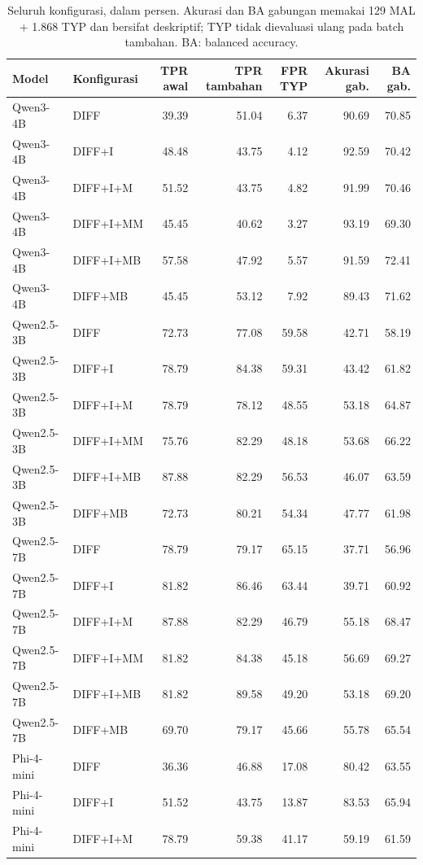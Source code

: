 \begin{table}[t]
\centering\small
\caption{Seluruh konfigurasi, dalam persen. Akurasi dan BA gabungan memakai 129 MAL + 1.868 TYP dan bersifat deskriptif; TYP tidak dievaluasi ulang pada batch tambahan. BA: balanced accuracy.}
\label{tab:full}
\begin{tabular}{llrrrrr}
\toprule
Model & Konfigurasi & TPR awal & TPR tambahan & FPR TYP & Akurasi gab. & BA gab. \\
\midrule
Qwen3-4B & DIFF & 39.39 & 51.04 & 6.37 & 90.69 & 70.85 \\
Qwen3-4B & DIFF+I & 48.48 & 43.75 & 4.12 & 92.59 & 70.42 \\
Qwen3-4B & DIFF+I+M & 51.52 & 43.75 & 4.82 & 91.99 & 70.46 \\
Qwen3-4B & DIFF+I+MM & 45.45 & 40.62 & 3.27 & 93.19 & 69.30 \\
Qwen3-4B & DIFF+I+MB & 57.58 & 47.92 & 5.57 & 91.59 & 72.41 \\
Qwen3-4B & DIFF+MB & 45.45 & 53.12 & 7.92 & 89.43 & 71.62 \\
Qwen2.5-3B & DIFF & 72.73 & 77.08 & 59.58 & 42.71 & 58.19 \\
Qwen2.5-3B & DIFF+I & 78.79 & 84.38 & 59.31 & 43.42 & 61.82 \\
Qwen2.5-3B & DIFF+I+M & 78.79 & 78.12 & 48.55 & 53.18 & 64.87 \\
Qwen2.5-3B & DIFF+I+MM & 75.76 & 82.29 & 48.18 & 53.68 & 66.22 \\
Qwen2.5-3B & DIFF+I+MB & 87.88 & 82.29 & 56.53 & 46.07 & 63.59 \\
Qwen2.5-3B & DIFF+MB & 72.73 & 80.21 & 54.34 & 47.77 & 61.98 \\
Qwen2.5-7B & DIFF & 78.79 & 79.17 & 65.15 & 37.71 & 56.96 \\
Qwen2.5-7B & DIFF+I & 81.82 & 86.46 & 63.44 & 39.71 & 60.92 \\
Qwen2.5-7B & DIFF+I+M & 87.88 & 82.29 & 46.79 & 55.18 & 68.47 \\
Qwen2.5-7B & DIFF+I+MM & 81.82 & 84.38 & 45.18 & 56.69 & 69.27 \\
Qwen2.5-7B & DIFF+I+MB & 81.82 & 89.58 & 49.20 & 53.18 & 69.20 \\
Qwen2.5-7B & DIFF+MB & 69.70 & 79.17 & 45.66 & 55.78 & 65.54 \\
Phi-4-mini & DIFF & 36.36 & 46.88 & 17.08 & 80.42 & 63.55 \\
Phi-4-mini & DIFF+I & 51.52 & 43.75 & 13.87 & 83.53 & 65.94 \\
Phi-4-mini & DIFF+I+M & 78.79 & 59.38 & 41.17 & 59.19 & 61.59 \\

\end{tabular}
\end{table}
